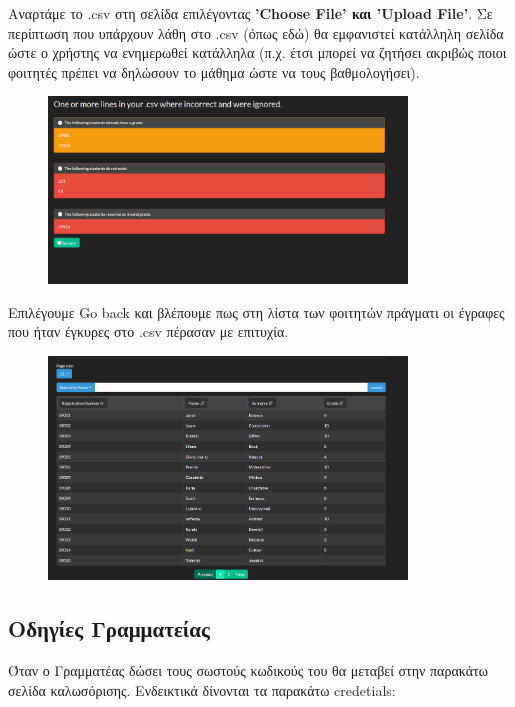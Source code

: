 \documentclass[12pt]{article}
\begin{document}
	Αναρτάμε το .csv στη σελίδα επιλέγοντας \textbf{'Choose File' και 'Upload File'}. Σε περίπτωση που υπάρχουν λάθη στο .csv (όπως εδώ) θα εμφανιστεί κατάλληλη σελίδα ώστε ο χρήστης να ενημερωθεί κατάλληλα (π.χ. έτσι μπορεί να ζητήσει ακριβώς ποιοι φοιτητές πρέπει να δηλώσουν το μάθημα ώστε να τους βαθμολογήσει).
	
	\begin{figure}[H]
		\centering
		\includegraphics[width=0.85\textwidth]{reported.png}
		\caption{}
		\label{fig:emptyView}
	\end{figure}

	Επιλέγουμε Go back και βλέπουμε πως στη λίστα των φοιτητών πράγματι οι έγραφες που ήταν έγκυρες στο .csv πέρασαν με επιτυχία.

	\begin{figure}[H]
		\centering
		\includegraphics[width=0.85\textwidth]{cool.png}
		\caption{}
		\label{fig:emptyView}
	\end{figure}
	
	\newpage
	\subsection{Οδηγίες Γραμματείας}
	
		Όταν ο Γραμματέας δώσει τους σωστούς κωδικούς του θα μεταβεί στην παρακάτω σελίδα καλωσόρισης. Ενδεικτικά δίνονται τα παρακάτω credetials:
	
\end{document}
